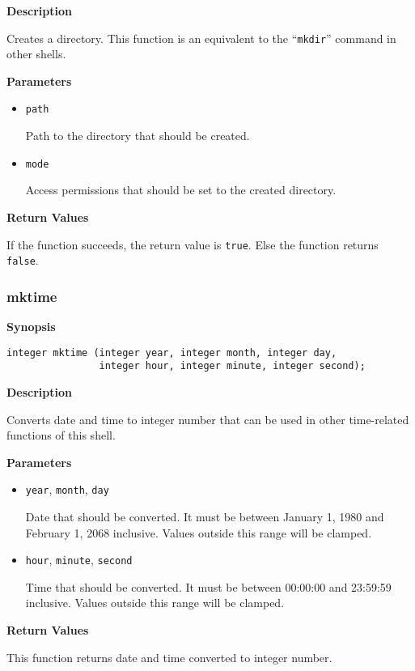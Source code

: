 \documentclass[a4paper, 10pt, titlepage]{article}
\begin{document}
\textbf{Description}

Creates a directory. This function is an equivalent to the ``\texttt{mkdir}'' command in other shells.

\textbf{Parameters}

\begin{itemize}
\item \texttt{path}

Path to the directory that should be created.

\item \texttt{mode}

Access permissions that should be set to the created directory.
\end{itemize}

\textbf{Return Values}

If the function succeeds, the return value is \texttt{true}. Else the function returns \texttt{false}.

\subsubsection{mktime}

\textbf{Synopsis}

\begin{verbatim}
integer mktime (integer year, integer month, integer day,
                integer hour, integer minute, integer second);
\end{verbatim}

\textbf{Description}

Converts date and time to integer number that can be used in other time-related functions of this shell.

\textbf{Parameters}

\begin{itemize}
\item \texttt{year}, \texttt{month}, \texttt{day}

Date that should be converted. It must be between January 1, 1980 and February 1, 2068 inclusive. Values outside this range will be clamped.

\item \texttt{hour}, \texttt{minute}, \texttt{second}

Time that should be converted. It must be between 00:00:00 and 23:59:59 inclusive. Values outside this range will be clamped.
\end{itemize}

\textbf{Return Values}

This function returns date and time converted to integer number.
\end{document}

